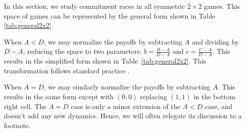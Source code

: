 \documentclass[letterpaper]{article}
\newcommand{\bparam}{b}
\newcommand{\cparam}{c}
\theoremstyle{definition}
\begin{document}
In this section, we study commitment races in all symmetric $2\times 2$ games. This space of games can be represented by the general form shown in Table \ref{tab:general2x2}. 

When $A < D$, we may normalize the payoffs by subtracting $A$ and dividing by $D - A$, reducing the space to two parameters: $\bparam = \frac{B - A}{D - A}$ and $\cparam = \frac{C - A}{D - A}$. This results in the simplified form shown in Table~\ref{tab:general2x2}. This transformation follows standard practice  \citep[see][and references therein]{tewolde_game_2024}.

When $A = D$, we may similarly normalize the payoffs by subtracting $A$. This results in the same form except with $(0,0)$ replacing $(1,1)$ in the bottom right cell. The $A = D$ case is only a minor extension of the $A < D$ case, and doesn't add any new dynamics. Hence, we will often relegate its discussion to a footnote.


\end{document}
